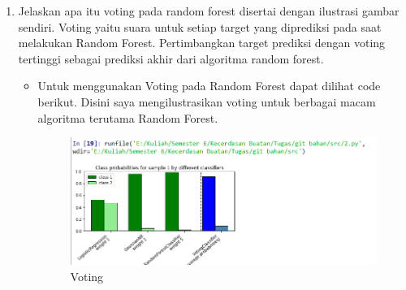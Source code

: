 \begin{enumerate}
\item Jelaskan apa itu voting pada random forest disertai dengan ilustrasi gambar sendiri.
Voting yaitu suara untuk setiap target yang diprediksi pada saat melakukan Random Forest. Pertimbangkan target prediksi dengan voting tertinggi sebagai prediksi akhir dari algoritma random forest.
\begin{itemize}
\item
Untuk menggunakan Voting pada Random Forest dapat dilihat code berikut. Disini saya mengilustrasikan voting untuk berbagai macam algoritma terutama Random Forest.
\begin{figure}[ht]
\centering
\includegraphics[scale=0.5]{figures/1174003/3/2.PNG}
\caption{Voting}
\label{contoh}
\end{figure}
\end{itemize}
\end{enumerate}


